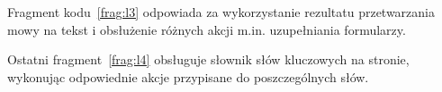 

Fragment kodu~\ref{frag:l3} odpowiada za wykorzystanie rezultatu przetwarzania mowy na tekst i obsłużenie różnych akcji m.in. uzupełniania formularzy.



Ostatni fragment~\ref{frag:l4} obsługuje słownik słów kluczowych na stronie, wykonując odpowiednie akcje przypisane do poszczególnych słów.

